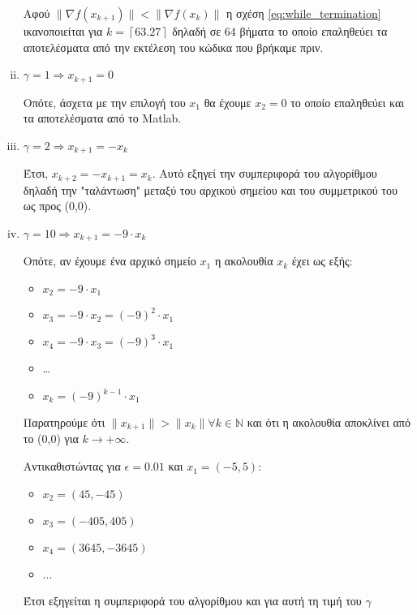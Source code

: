 \begin{enumerate}[i)]
	Αφού $\parallel \nabla f(x_{k+1}) \parallel < \parallel \nabla f(x_k) \parallel$ η σχέση \ref{eq:while_termination} ικανοποιείται για $k = \left \lceil{63.27}\right \rceil$
	δηλαδή σε 64 βήματα το οποίο επαληθεύει τα αποτελέσματα από την εκτέλεση του κώδικα που βρήκαμε πριν.
	
	\item $\gamma = 1 \Rightarrow x_{k+1} = 0$
	
	Οπότε, άσχετα με την επιλογή του $x_1$ θα έχουμε $x_2 = 0$ το οποίο επαληθεύει και τα αποτελέσματα από το Matlab.
	
 	\item $\gamma = 2 \Rightarrow x_{k+1} = -x_{k}$
 	
 	Έτσι, $x_{k+2}=-x_{k+1}=x_{k}$. 
 	Αυτό εξηγεί την συμπεριφορά του αλγορίθμου δηλαδή την "ταλάντωση" μεταξύ του αρχικού σημείου και του συμμετρικού του ως προς (0,0).
 	\item $\gamma = 10  \Rightarrow x_{k+1} = -9 \cdot x_k$
 		
	Οπότε, αν έχουμε ένα αρχικό σημείο $x_1$ η ακολουθία $x_k$ έχει ως εξής:
	\begin{itemize}
		\item $x_2 = -9 \cdot x_1$
		\item $x_3 = -9 \cdot x_2 = (-9)^2 \cdot x_1$
		\item $x_4 = -9 \cdot x_3 = (-9)^3 \cdot x_1$
		\item \ldots
		\item $x_k = (-9)^{k-1} \cdot x_1$
	\end{itemize}
	Παρατηρούμε ότι $\parallel x_{k+1} \parallel > \parallel x_{k} \parallel \forall k \in \mathbb{N}$ και ότι η ακολουθία αποκλίνει από το (0,0) για $k \to +\infty$.
	
	Αντικαθιστώντας για $\epsilon = 0.01$ και $x_1 = (-5, 5)$:
	\begin{itemize}
		\item $x_2 = (45, -45)$
		\item $x_3 = (-405, 405)$
		\item $x_4 = (3645, -3645)$
		\item ...
	\end{itemize}
	Έτσι εξηγείται η συμπεριφορά του αλγορίθμου και για αυτή τη τιμή του $\gamma$
\end{enumerate}